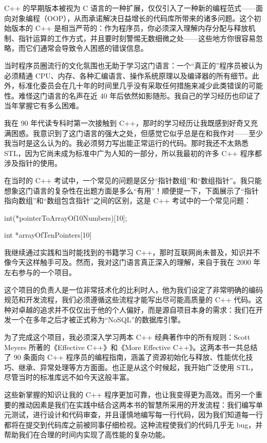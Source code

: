 C++ 的早期版本被视为 C 语言的一种扩展，仅仅引入了一种新的编程范式——面向对象编程（OOP），从而承诺解决日益增长的代码库所带来的诸多问题。这个初始版本的 C++ 是相当严苛的：作为程序员，你必须深入理解内存分配与释放机制、指针运算的工作方式，并且要时刻警惕无数细微之处——这些地方你很容易忽略，而它们通常会导致令人困惑的错误信息。

当时程序员圈流行的文化氛围也无助于学习这门语言：一个“真正的”程序员被认为必须精通 CPU、内存、各种汇编语言、操作系统原理以及编译器的所有细节。此外，标准化委员会在几十年的时间里几乎没有采取任何措施来减少此类错误的可能性。难怪这门语言的名声在近 40 年后依然如影随形。我自己的学习经历也印证了当年掌握它有多么困难。

我在 90 年代读专科时第一次接触到 C++，那时的学习经历让我既感到好奇又充满困惑。我意识到了这门语言的强大之处，但感觉它似乎总是在和我作对——至少我当时是这么认为的。我必须努力写出能正常运行的代码。那时我还不太熟悉 STL，因为它尚未成为标准中广为人知的一部分，所以我最初的许多 C++ 程序都涉及指针的使用。

在当时的 C++ 考试中，一个常见的问题是区分“指针数组”和“数组指针”。我只能想象这门语言的复杂性在出题方面是多么“有用”！顺便提一下，下面展示了“指针指向数组”和“数组包含指针”之间的区别，这是 C++ 考试中的一个常见问题：

\begin{cpp}
int(*pointerToArrayOf10Numbers)[10];

int *arrayOfTenPointers[10]
\end{cpp}

我继续通过实践和当时能找到的书籍学习 C++，那时互联网尚未普及，知识并不像今天这样触手可及。然而，我对这门语言真正深入的理解，来自于我在 2000 年左右参与的一个项目。

这个项目的负责人是一位非常技术化的比利时人，他为我们设定了非常明确的编码规范和开发流程，我们必须遵循这些流程才能写出尽可能高质量的 C++ 代码。这种对卓越的追求并不仅仅出于他的个人偏好，而是源自项目本身的需求：我们在开发一个在多年之后才被正式称为“NoSQL”的数据库引擎。

为了完成这个项目，我必须深入学习两本 C++ 经典著作中的所有规则：Scott Meyers 所著的《Effective C++》和《More Effective C++》。这两本书一共总结了 90 条面向 C++ 程序员的编程指南，涵盖了资源初始化与释放、性能优化技巧、继承、异常处理等方方面面。也正是从这个时候起，我开始广泛使用 STL，尽管当时的标准库远不如今天这般丰富。

这些新掌握的知识让我的 C++ 程序更加可靠，也让我变得更为高效。而另一个重要的推动因素是我们在实践中结合这两本书的智慧所采用的开发流程：我们编写单元测试，进行设计和代码审查，并且谨慎地编写每一行代码，因为我们知道每一行都将在提交到代码库之前被同事仔细检视。这种流程使我们的代码几乎无 bug，并帮助我们在合理的时间内实现了高性能的复杂功能。

